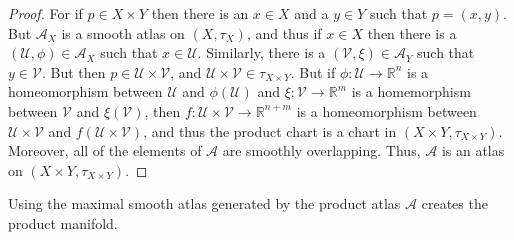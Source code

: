 \documentclass[oneside]{book}                                                  %
\begin{document}
            \begin{proof}
                For if $p\in{X}\times{Y}$ then there is an $x\in{X}$ and a
                $y\in{Y}$ such that $p=(x,y)$. But $\mathcal{A}_{X}$ is a smooth
                atlas on $(X,\tau_{X})$, and thus if $x\in{X}$ then there is a
                $(\mathcal{U},\phi)\in\mathcal{A}_{X}$ such that $x\in\mathcal{U}$.
                Similarly, there is a $(\mathcal{V},\xi)\in\mathcal{A}_{Y}$ such
                that $y\in\mathcal{V}$. But then $p\in\mathcal{U}\times\mathcal{V}$,
                and $\mathcal{U}\times\mathcal{V}\in\tau_{X\times{Y}}$. But if
                $\phi:\mathcal{U}\rightarrow\mathbb{R}^{n}$ is a homeomorphism
                between $\mathcal{U}$ and $\phi(\mathcal{U})$ and
                $\xi:\mathcal{V}\rightarrow\mathbb{R}^{m}$ is a homemorphism
                between $\mathcal{V}$ and $\xi(\mathcal{V})$, then
                $f:\mathcal{U}\times\mathcal{V}\rightarrow\mathbb{R}^{n+m}$ is
                a homeomorphism between $\mathcal{U}\times\mathcal{V}$ and
                $f(\mathcal{U}\times\mathcal{V})$, and thus the product chart
                is a chart in $(X\times{Y},\tau_{X\times{Y}})$. Moreover, all of
                the elements of $\mathcal{A}$ are smoothly overlapping. Thus,
                $\mathcal{A}$ is an atlas on $(X\times{Y},\tau_{X\times{Y}})$.
            \end{proof}
            Using the maximal smooth atlas generated by the product atlas
            $\mathcal{A}$ creates the product manifold.
\end{document}
